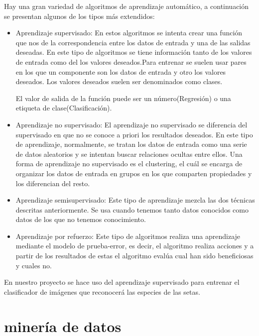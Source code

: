 Hay una gran variedad de algoritmos de aprendizaje automático, a continuación se presentan algunos de los tipos más extendidos:
\begin{itemize}

	\item{Aprendizaje supervisado}: En estos algoritmos se intenta crear una función que nos de la correspondencia entre los datos de entrada y una de las salidas deseadas. En este tipo de algoritmos se tiene información tanto de los valores de entrada como del los valores deseados.Para entrenar se suelen usar pares en los que un componente son los datos de entrada y otro los valores deseados. Los valores deseados suelen ser denominados como clases.~\cite{wiki:aprendizaheSupervisado}
	
	El valor de salida de la función puede ser un número(Regresión) o una etiqueta de clase(Clasificación).
	\item{Aprendizaje no supervisado}: El aprendizaje no supervisado se diferencia del supervisado en que no se conoce a priori los resultados deseados. En este tipo de aprendizaje, normalmente, se tratan los datos de entrada como una serie de datos aleatorios y se intentan buscar relaciones ocultas entre ellos.
	Una forma de aprendizaje no supervisado es el clustering, el cuál se encarga de organizar los datos de entrada en grupos en los que comparten propiedades y los diferencian del resto.~\cite{wiki:aprendizajeNoSupervisado}
	
	\item{Aprendizaje semisupervisado}: Este tipo de aprendizaje mezcla las dos técnicas descritas anteriormente. Se usa cuando tenemos tanto datos conocidos como datos de los que no tenemos conocimiento.
	
	\item{Aprendizaje por refuerzo}: Este tipo de algoritmos realiza una aprendizaje mediante el modelo de prueba-error, es decir, el algoritmo realiza acciones y a partir de los resultados de estas el algoritmo evalúa cual han sido beneficiosas y cuales no.
\end{itemize}
	
En nuestro proyecto se hace uso del aprendizaje supervisado para entrenar el clasificador de imágenes que reconocerá las especies de las setas.
~\cite{wiki:aprendizajeAutomatico}

\section{minería de datos}

